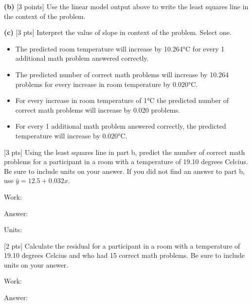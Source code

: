 \documentclass[12pt, oneside]{article}
\newcommand{\noi}{\noindent}
\begin{document}
{\bf (b)} [3 points] Use the linear model output above to write the least
squares line in the context of the problem.

\vspace{1in}

{\bf (c)}	[3 pts] Interpret the value of slope in context of the problem.
Select one.

\begin{itemize}
\item The predicted room temperature will increase by 10.264°C for every 1
additional math problem answered correctly.
\item The predicted number of correct math problems will increase by 10.264
problems for every increase in room temperature by 0.020°C. 
\item For every increase in room temperature of 1°C the predicted number of 
correct math problems will increase by 0.020 problems.
\item For every 1 additional math problem answered correctly, the predicted
temperature will increase by 0.020°C.
\end{itemize}

\noi {\bf (d)} [3 pts] Using the least squares line in part b, predict the number of
correct math problems for a participant in a room with a temperature of 19.10 
degrees Celcius. Be sure to include units on your answer.  If you did not find
an answer to part b, use $\hat{y} = 12.5 + 0.032x$.

\vspace{0.25cm}

Work:  

\vspace{0.5cm}

Answer: \underline{\hspace{2in}}

Units: \underline{\hspace{2in}}

\vspace{0.5cm}

\noi {\bf (e)} [2 pts] Calculate the residual for a participant in a room with a
temperature of  19.10 degrees Celcius and who had 15 correct math problems. Be
sure to include units on your answer.

\vspace{0.25cm}

Work:  

\vspace{0.5cm}

Answer: \underline{\hspace{2in}}
\end{document}
